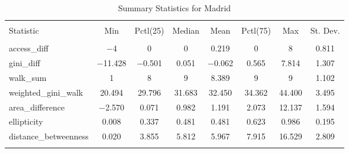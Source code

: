 
\begin{table}[!htbp] \centering 
  \caption{Summary Statistics for Madrid} 
  \label{} 
\begin{tabular}{@{\extracolsep{5pt}}lccccccc} 
\\[-1.8ex]\hline 
\hline \\[-1.8ex] 
Statistic & \multicolumn{1}{c}{Min} & \multicolumn{1}{c}{Pctl(25)} & \multicolumn{1}{c}{Median} & \multicolumn{1}{c}{Mean} & \multicolumn{1}{c}{Pctl(75)} & \multicolumn{1}{c}{Max} & \multicolumn{1}{c}{St. Dev.} \\ 
\hline \\[-1.8ex] 
access\_diff & $-$4 & 0 & 0 & 0.219 & 0 & 8 & 0.811 \\ 
gini\_diff & $-$11.428 & $-$0.501 & 0.051 & $-$0.062 & 0.565 & 7.814 & 1.307 \\ 
walk\_sum & 1 & 8 & 9 & 8.389 & 9 & 9 & 1.102 \\ 
weighted\_gini\_walk & 20.494 & 29.796 & 31.683 & 32.450 & 34.362 & 44.400 & 3.495 \\ 
area\_difference & $-$2.570 & 0.071 & 0.982 & 1.191 & 2.073 & 12.137 & 1.594 \\ 
ellipticity & 0.008 & 0.337 & 0.481 & 0.481 & 0.623 & 0.986 & 0.195 \\ 
distance\_betweenness & 0.020 & 3.855 & 5.812 & 5.967 & 7.915 & 16.529 & 2.809 \\ 
\hline \\[-1.8ex] 
\end{tabular} 
\end{table} 
